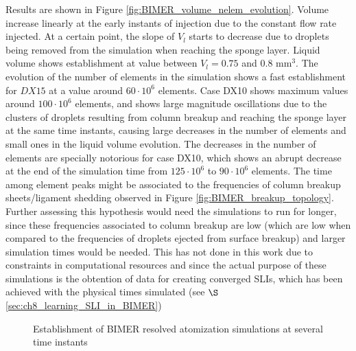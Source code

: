 Results are shown in Figure \ref{fig:BIMER_volume_nelem_evolution}. Volume increase linearly at the early instants of injection due to the constant flow rate injected. At a certain point, the slope of $V_l$ starts to decrease due to droplets being removed from the simulation when reaching the sponge layer. Liquid volume shows establishment at value between $V_l = 0.75$ and $0.8$ mm$^3$. The evolution of the number of elements in the simulation shows a fast establishment for $DX15$ at a value around $60 \cdot 10^6$ elements. Case DX10 shows maximum values around $100 \cdot 10^6$ elements, and shows large magnitude oscillations due to the clusters of droplets resulting from column breakup and reaching the sponge layer at the same time instants, causing large decreases in the number of elements and small ones in the liquid volume evolution. The decreases in the number of elements are specially notorious for case DX10, which shows an abrupt decrease at the end of the simulation time from $125 \cdot 10^6$ to $90 \cdot 10^6$ elements. The time among element peaks might be associated to the frequencies of column breakup sheets/ligament shedding observed in Figure \ref{fig:BIMER_breakup_topology}. Further assessing this hypothesis would need the simulations to run for longer, since these frequencies associated to column breakup are low (which are low when compared to the frequencies of droplets ejected from surface breakup) and larger simulation times would be needed. This has not done in this work due to constraints in computational resources and since the actual purpose of these simulations is the obtention of data for creating converged SLIs, which has been achieved with the physical times simulated (see $\S$\ref{sec:ch8_learning_SLI_in_BIMER})

\clearpage

\begin{figure}[ht]
\centering
{}
\caption{Establishment of BIMER resolved atomization simulations at several time instants}
\label{fig:BIMER_jet_establishment}
\end{figure}

\clearpage







